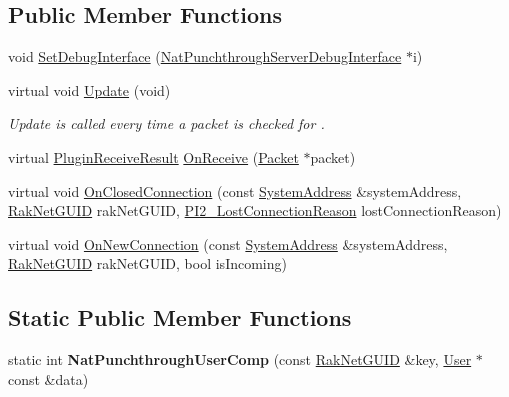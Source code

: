\subsection*{Public Member Functions}
\begin{DoxyCompactItemize}
\item 
void \hyperlink{class_rak_net_1_1_nat_punchthrough_server_aa6eba1cfcd6cae940981558c40353c07}{Set\-Debug\-Interface} (\hyperlink{struct_rak_net_1_1_nat_punchthrough_server_debug_interface}{Nat\-Punchthrough\-Server\-Debug\-Interface} $\ast$i)
\item 
\hypertarget{class_rak_net_1_1_nat_punchthrough_server_a21c9a2e4cce1eba091d85c221b950dda}{virtual void \hyperlink{class_rak_net_1_1_nat_punchthrough_server_a21c9a2e4cce1eba091d85c221b950dda}{Update} (void)}\label{class_rak_net_1_1_nat_punchthrough_server_a21c9a2e4cce1eba091d85c221b950dda}

\begin{DoxyCompactList}\small\item\em Update is called every time a packet is checked for . \end{DoxyCompactList}\item 
virtual \hyperlink{group___p_l_u_g_i_n___i_n_t_e_r_f_a_c_e___g_r_o_u_p_ga89998adaafb29e5d879113b992161085}{Plugin\-Receive\-Result} \hyperlink{class_rak_net_1_1_nat_punchthrough_server_ac94ec3872057d6488455aa54f0b577cc}{On\-Receive} (\hyperlink{struct_rak_net_1_1_packet}{Packet} $\ast$packet)
\item 
virtual void \hyperlink{class_rak_net_1_1_nat_punchthrough_server_a45deb0ea94031ed5ca18592fe9555609}{On\-Closed\-Connection} (const \hyperlink{struct_rak_net_1_1_system_address}{System\-Address} \&system\-Address, \hyperlink{struct_rak_net_1_1_rak_net_g_u_i_d}{Rak\-Net\-G\-U\-I\-D} rak\-Net\-G\-U\-I\-D, \hyperlink{group___p_l_u_g_i_n___i_n_t_e_r_f_a_c_e___g_r_o_u_p_ga376cc546fd6892c2ead48cd51796c8b8}{P\-I2\-\_\-\-Lost\-Connection\-Reason} lost\-Connection\-Reason)
\item 
virtual void \hyperlink{class_rak_net_1_1_nat_punchthrough_server_a18194f2e4d4f75ae1cd7d0360339a0bb}{On\-New\-Connection} (const \hyperlink{struct_rak_net_1_1_system_address}{System\-Address} \&system\-Address, \hyperlink{struct_rak_net_1_1_rak_net_g_u_i_d}{Rak\-Net\-G\-U\-I\-D} rak\-Net\-G\-U\-I\-D, bool is\-Incoming)
\end{DoxyCompactItemize}
\subsection*{Static Public Member Functions}
\begin{DoxyCompactItemize}
\item 
\hypertarget{class_rak_net_1_1_nat_punchthrough_server_a35f1a8872a23cba83a1bfb56f6dabbc3}{static int {\bfseries Nat\-Punchthrough\-User\-Comp} (const \hyperlink{struct_rak_net_1_1_rak_net_g_u_i_d}{Rak\-Net\-G\-U\-I\-D} \&key, \hyperlink{struct_rak_net_1_1_nat_punchthrough_server_1_1_user}{User} $\ast$const \&data)}\label{class_rak_net_1_1_nat_punchthrough_server_a35f1a8872a23cba83a1bfb56f6dabbc3}

\end{DoxyCompactItemize}
